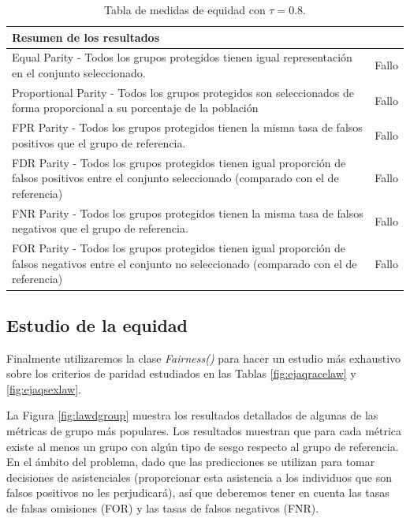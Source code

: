 \begin{table}[h]
\centering
\resizebox{17.cm}{!} {
\begin{tabular}{ll}
\textbf{Resumen de los resultados}                                                                                                                              &                              \\ \hline
Equal Parity - Todos los grupos protegidos tienen igual representación en el conjunto seleccionado.                                                     & {\color[HTML]{FE0000} Fallo} \\
Proportional Parity - Todos los grupos protegidos son seleccionados de forma proporcional a su porcentaje de la población                               & {\color[HTML]{FE0000} Fallo} \\
FPR Parity - Todos los grupos protegidos tienen la misma tasa de falsos positivos que el grupo de referencia.                                           & {\color[HTML]{FE0000} Fallo} \\
FDR Parity - Todos los grupos protegidos tienen igual proporción de falsos positivos entre el conjunto seleccionado (comparado con el de referencia)    & {\color[HTML]{FE0000} Fallo} \\
FNR Parity - Todos los grupos protegidos tienen la misma tasa de falsos negativos que el grupo de referencia.                                           & {\color[HTML]{FE0000} Fallo} \\
FOR Parity - Todos los grupos protegidos tienen igual proporción de falsos negativos entre el conjunto no seleccionado (comparado con el de referencia) & {\color[HTML]{FE0000} Fallo}
\end{tabular}
}
	\caption{Tabla de medidas de equidad con $\tau=0.8$.}
    \label{fig:medequmbral2}
\end{table}

\subsection*{Estudio de la equidad}

Finalmente utilizaremos la clase \textit{Fairness()} para hacer un estudio más exhaustivo sobre los criterios de paridad estudiados en las Tablas \ref{fig:ejaqracelaw} y \ref{fig:ejaqsexlaw}.

La Figura \ref{fig:lawdgroup} muestra los resultados detallados de algunas de las métricas de grupo más populares. Los resultados muestran que para cada métrica existe al menos un grupo con algún tipo de sesgo respecto al grupo de referencia. En el ámbito del problema, dado que las predicciones se utilizan para tomar decisiones de asistenciales (proporcionar esta asistencia a los individuos que son falsos positivos no les perjudicará), así que deberemos tener en cuenta las tasas de falsas omisiones (FOR) y las tasas de falsos negativos (FNR).\\

